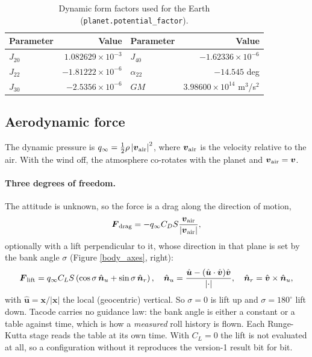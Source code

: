 \documentclass[11pt,a4paper]{article}
\newcommand{\bx}{{\boldsymbol x}}
\newcommand{\bv}{{\boldsymbol v}}
\newcommand{\bF}{{\boldsymbol F}}
\begin{document}
\begin{table}[h]
\caption{Dynamic form factors used for the Earth (\texttt{planet.potential\_factor}).}
\label{J_parameters}
\begin{center}
\begin{tabular}{l|r|l|r}
\hline \hline
Parameter & Value & Parameter & Value \\
\hline
$J_{20}$ & $1.082629 \times 10^{-3}$   & $J_{40}$ & $-1.62336 \times 10^{-6}$ \\
$J_{22}$ & $-1.81222 \times 10^{-6}$   & $\alpha_{22}$ & $-14.545$ deg \\
$J_{30}$ & $-2.5356 \times 10^{-6}$    & $GM$ & $3.98600 \times 10^{14}$ m$^3$/s$^2$ \\
\hline \hline
\end{tabular}
\end{center}
\end{table}

\subsection{Aerodynamic force}

The dynamic pressure is $q_{\infty} = \frac{1}{2} \rho \left| \bv_{\rm air} \right|^2$,
where $\bv_{\rm air}$ is the velocity relative to the air. With the wind off, the
atmosphere co-rotates with the planet and $\bv_{\rm air} = \bv$.

\paragraph{Three degrees of freedom.}
The attitude is unknown, so the force is a drag along the direction of motion,
%
\begin{align}
	\bF_{\rm drag} = - q_{\infty} C_D S \frac{ \bv_{\rm air} }{\left| \bv_{\rm air} \right|} ,
\end{align}
%
optionally with a lift perpendicular to it, whose direction in that plane is set by the
bank angle $\sigma$ (Figure \ref{body_axes}, right):
%
\begin{align}
	\bF_{\rm lift} = q_{\infty} C_L S \left( \cos\sigma \, \hat{\boldsymbol n}_u + \sin\sigma \, \hat{\boldsymbol n}_r \right) ,
	\quad
	\hat{\boldsymbol n}_u = \frac{ \hat{\boldsymbol u} - ( \hat{\boldsymbol u} \cdot \hat{\bv} ) \hat{\bv} }{ \left| \cdot \right| } ,
	\quad
	\hat{\boldsymbol n}_r = \hat{\bv} \times \hat{\boldsymbol n}_u ,
	\label{lift}
\end{align}
%
with $\hat{\boldsymbol u} = \bx / |\bx|$ the local (geocentric) vertical. So $\sigma = 0$
is lift up and $\sigma = 180^\circ$ lift down. Tacode carries no guidance law: the bank
angle is either a constant or a table against time, which is how a \emph{measured} roll
history is flown. Each Runge-Kutta stage reads the table at its own time. With
$C_L = 0$ the lift is not evaluated at all, so a configuration without it reproduces the
version-1 result bit for bit.
\end{document}
